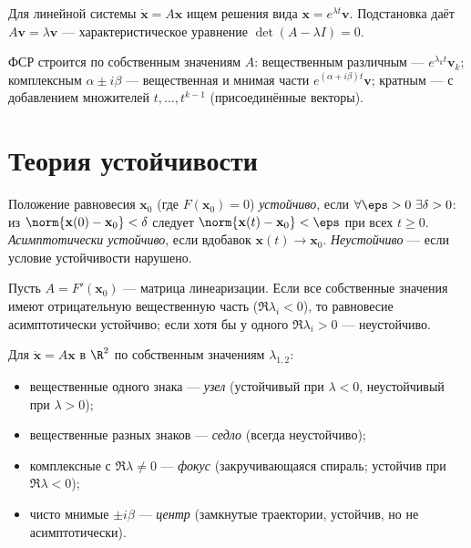 \begin{theorem}
Для линейной системы $\dot{\mathbf x}=A\mathbf x$ ищем решения вида $\mathbf x=e^{\lambda t}\mathbf v$.
Подстановка даёт $A\mathbf v=\lambda\mathbf v$ — характеристическое уравнение $\det(A-\lambda I)=0$.
\end{theorem}

\begin{remark}
ФСР строится по собственным значениям $A$: вещественным различным — $e^{\lambda_k t}\mathbf v_k$;
комплексным $\alpha\pm i\beta$ — вещественная и мнимая части $e^{(\alpha+i\beta)t}\mathbf v$;
кратным — с добавлением множителей $t,\dots,t^{k-1}$ (присоединённые векторы).
\end{remark}

\section{Теория устойчивости}

\begin{definition}[по Ляпунову]
Положение равновесия $\mathbf x_0$ (где $F(\mathbf x_0)=0$) \emph{устойчиво}, если
$\forall\eps>0\ \exists\delta>0$: из $\norm{\mathbf x(0)-\mathbf x_0}<\delta$ следует
$\norm{\mathbf x(t)-\mathbf x_0}<\eps$ при всех $t\ge0$. \emph{Асимптотически устойчиво}, если вдобавок
$\mathbf x(t)\to\mathbf x_0$. \emph{Неустойчиво} — если условие устойчивости нарушено.
\end{definition}

\begin{theorem}
Пусть $A=F'(\mathbf x_0)$ — матрица линеаризации. Если все собственные значения имеют отрицательную
вещественную часть ($\Re\lambda_i<0$), то равновесие асимптотически устойчиво; если хотя бы у одного
$\Re\lambda_i>0$ — неустойчиво.
\end{theorem}

\begin{remark}
Для $\dot{\mathbf x}=A\mathbf x$ в $\R^2$ по собственным значениям $\lambda_{1,2}$:
\begin{itemize}[leftmargin=*,nosep]
  \item вещественные одного знака — \emph{узел} (устойчивый при $\lambda<0$, неустойчивый при $\lambda>0$);
  \item вещественные разных знаков — \emph{седло} (всегда неустойчиво);
  \item комплексные с $\Re\lambda\ne0$ — \emph{фокус} (закручивающаяся спираль; устойчив при $\Re\lambda<0$);
  \item чисто мнимые $\pm i\beta$ — \emph{центр} (замкнутые траектории, устойчив, но не асимптотически).
\end{itemize}
\end{remark}
